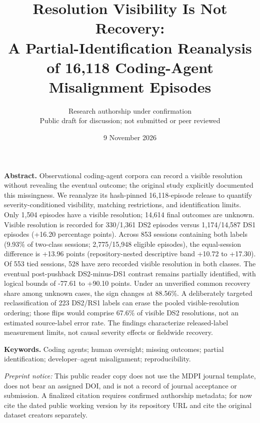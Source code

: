 \documentclass[11pt,a4paper]{article}
\title{\bfseries\LARGE Resolution Visibility Is Not Recovery:\\[5pt] A Partial-Identification Reanalysis of 16,118 Coding-Agent Misalignment Episodes}
\author{Research authorship under confirmation\\\small Public draft for discussion; not submitted or peer reviewed}
\date{9 November 2026}
\begin{document}
\maketitle
\noindent\textbf{Abstract.} Observational coding-agent corpora can record a visible resolution without revealing the eventual outcome; the original study explicitly documented this missingness. We reanalyze its hash-pinned 16,118-episode release to quantify severity-conditioned visibility, matching restrictions, and identification limits. Only 1,504 episodes have a visible resolution; 14,614 final outcomes are unknown. Visible resolution is recorded for 330/1,361 DS2 episodes versus 1,174/14,587 DS1 episodes (+16.20 percentage points). Across 853 sessions containing both labels (9.93\% of two-class sessions; 2,775/15,948 eligible episodes), the equal-session difference is +13.96 points (repository-nested descriptive band +10.72 to +17.30). Of 553 tied sessions, 528 have zero recorded visible resolution in both classes. The eventual post-pushback DS2-minus-DS1 contrast remains partially identified, with logical bounds of -77.61 to +90.10 points. Under an unverified common recovery share among unknown cases, the sign changes at 88.56\%. A deliberately targeted reclassification of 223 DS2/RS1 labels can erase the pooled visible-resolution ordering; those flips would comprise 67.6\% of visible DS2 resolutions, not an estimated source-label error rate. The findings characterize released-label measurement limits, not causal severity effects or fieldwide recovery.

\noindent\textbf{Keywords.} Coding agents; human oversight; missing outcomes; partial identification; developer--agent misalignment; reproducibility.

\medskip\noindent\textit{Preprint notice:} This public reader copy does not use the MDPI journal template, does not bear an assigned DOI, and is not a record of journal acceptance or submission. A finalized citation requires confirmed authorship metadata; for now cite the dated public working version by its repository URL and cite the original dataset creators separately.

\clearpage
\appendix
\renewcommand{\thetable}{A\arabic{table}}
\renewcommand{\theHtable}{appendix.table.\arabic{table}}
\renewcommand{\theequation}{A\arabic{equation}}
\renewcommand{\theHequation}{appendix.equation.\arabic{equation}}
\setcounter{table}{0}
\setcounter{equation}{0}

\setcounter{table}{0}
\renewcommand{\thetable}{B\arabic{table}}
\renewcommand{\theHtable}{appendixB.table.\arabic{table}}

\end{document}
